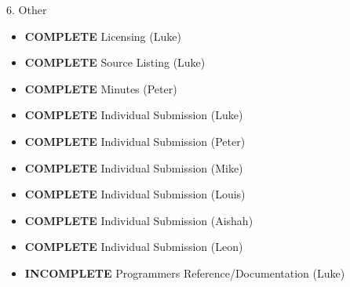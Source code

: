 6. Other
\begin{itemize}
\item \textbf{COMPLETE}   Licensing (Luke)
\item \textbf{COMPLETE}   Source Listing (Luke)
\item \textbf{COMPLETE}    Minutes (Peter)
\item \textbf{COMPLETE}   Individual Submission (Luke)
\item \textbf{COMPLETE}   Individual Submission (Peter)
\item \textbf{COMPLETE}   Individual Submission (Mike)
\item \textbf{COMPLETE}   Individual Submission (Louis)
\item \textbf{COMPLETE}   Individual Submission (Aishah)
\item \textbf{COMPLETE}   Individual Submission (Leon)
\item \textbf{INCOMPLETE} Programmers Reference/Documentation (Luke)
\end{itemize}
